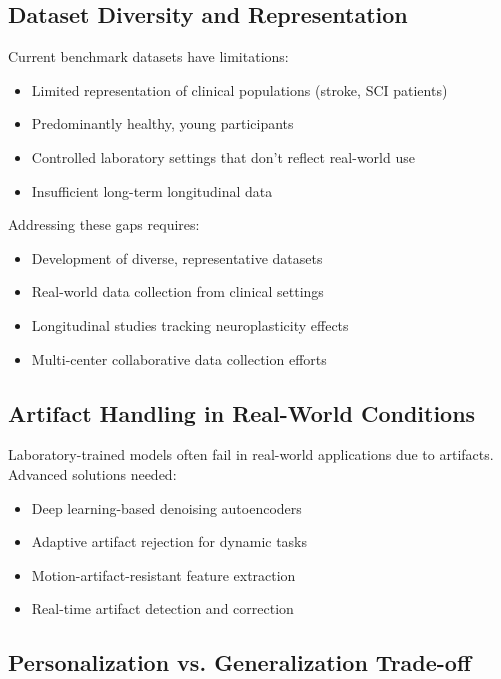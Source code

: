 \documentclass[12pt]{article}
\begin{document}
\subsection{Dataset Diversity and Representation}

Current benchmark datasets have limitations:
\begin{itemize}
    \item Limited representation of clinical populations (stroke, SCI patients)
    \item Predominantly healthy, young participants
    \item Controlled laboratory settings that don't reflect real-world use
    \item Insufficient long-term longitudinal data
\end{itemize}

Addressing these gaps requires:
\begin{itemize}
    \item Development of diverse, representative datasets
    \item Real-world data collection from clinical settings
    \item Longitudinal studies tracking neuroplasticity effects
    \item Multi-center collaborative data collection efforts
\end{itemize}

\subsection{Artifact Handling in Real-World Conditions}

Laboratory-trained models often fail in real-world applications due to artifacts. Advanced solutions needed:
\begin{itemize}
    \item Deep learning-based denoising autoencoders
    \item Adaptive artifact rejection for dynamic tasks
    \item Motion-artifact-resistant feature extraction
    \item Real-time artifact detection and correction
\end{itemize}

\subsection{Personalization vs. Generalization Trade-off}
\end{document}
